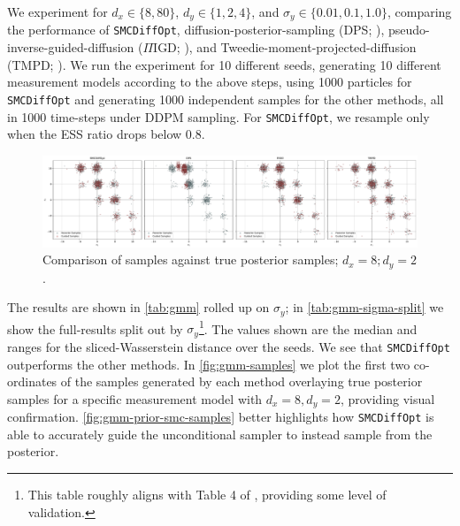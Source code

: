We experiment for $d_x \in \{8, 80\}$, $d_y \in \{1, 2, 4\}$, and $\sigma_y \in \{0.01, 0.1, 1.0\}$,
comparing the performance of \texttt{SMCDiffOpt}, diffusion-posterior-sampling (DPS;
\cite{chungDiffusionPosteriorSampling2022}), pseudo-inverse-guided-diffusion ($\Pi$IGD;
\cite{song2023pseudoinverseguided}), and Tweedie-moment-projected-diffusion (TMPD;
\cite{boysTweedieMomentProjected2023}). We run the experiment for 10 different seeds,
generating 10 different measurement models according to the above steps, using 1000
particles for \texttt{SMCDiffOpt} and generating 1000 independent samples for the other methods,
all in 1000 time-steps under DDPM sampling. For \texttt{SMCDiffOpt}, we resample only when the ESS
ratio drops below $0.8$.

\begin{figure}[t]
    \centering
    \includegraphics[width=1\textwidth]{assets/gmm_samples.pdf}
    \caption{Comparison of samples against true posterior samples; $d_x = 8; d_y = 2$.}
    \label{fig:gmm-samples}
\end{figure}

The results are shown in \autoref{tab:gmm} rolled up on $\sigma_y$; in \autoref{tab:gmm-sigma-split} we
show the full-results split out by $\sigma_y$\footnote{This table roughly aligns with Table 4 of
\textcite{boysTweedieMomentProjected2023}, providing some level of validation.}. The values shown
are the median and ranges for the sliced-Wasserstein distance over the seeds. We see
that \texttt{SMCDiffOpt} outperforms the other methods. In \autoref{fig:gmm-samples} we plot the
first two co-ordinates of the samples generated by each method overlaying true posterior samples for
a specific measurement model with $d_x = 8, d_y = 2$, providing visual confirmation.
\autoref{fig:gmm-prior-smc-samples} better highlights how \texttt{SMCDiffOpt} is able to accurately
guide the unconditional sampler to instead sample from the posterior.

